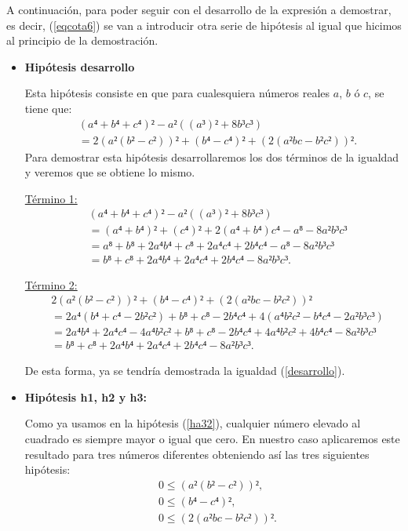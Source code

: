 \begin{demostracion}
  A continuación, para poder seguir con el desarrollo de la expresión a
  demostrar, es decir, (\ref{eqcota6}) se van a introducir otra serie de
  hipótesis al igual que hicimos al principio de la demostración.
  \begin{itemize}
  \item \textbf{Hipótesis desarrollo}

    Esta hipótesis consiste en que para cualesquiera números reales
    \(a\), \(b\) ó \(c\), se tiene que:
    \begin{align*}\label{desarrollo}\tag{desarrollo}
      & (a⁴+b⁴+c⁴)²-a²((a³)²+8b³c³) \\
      & = 2(a²(b²-c²))²+(b⁴-c⁴)²+(2(a²bc-b²c²))².
    \end{align*}
    Para demostrar esta hipótesis desarrollaremos los dos términos de la
    igualdad y veremos que se obtiene lo mismo.

    \underline{Término 1:}
    \begin{align*}
      & (a⁴+b⁴+c⁴)²-a²((a³)²+8b³c³)\\
      & = (a⁴+b⁴)²+(c⁴)²+2(a⁴+b⁴)c⁴-a⁸-8a²b³c³\\
      & = a⁸+b⁸+2a⁴b⁴+c⁸+2a⁴c⁴+2b⁴c⁴-a⁸-8a²b³c³\\
      & = b⁸+c⁸+2a⁴b⁴+2a⁴c⁴+2b⁴c⁴-8a²b³c³.
    \end{align*}

    \underline{Término 2:}
    \begin{align*}
      & 2(a²(b²-c²))²+(b⁴-c⁴)²+(2(a²bc-b²c²))² \\
      & = 2a⁴(b⁴+c⁴-2b²c²)+b⁸+c⁸-2b⁴c⁴+4(a⁴b²c²-b⁴c⁴-2a²b³c³)\\
      & = 2a⁴b⁴+2a⁴c⁴-4a⁴b²c²+b⁸+c⁸-2b⁴c⁴+4a⁴b²c²+4b⁴c⁴-8a²b³c³\\
      & = b⁸+c⁸+2a⁴b⁴+2a⁴c⁴+2b⁴c⁴-8a²b³c³.
    \end{align*}

    De esta forma, ya se tendría demostrada la igualdad (\ref{desarrollo}).

  \item \textbf{Hipótesis h1, h2 y h3:}

    Como ya usamos en la hipótesis (\ref{ha32}), cualquier número
    elevado al cuadrado es siempre mayor o igual que cero. En nuestro
    caso aplicaremos este resultado para tres números diferentes
    obteniendo así las tres siguientes hipótesis:
    \begin{align}
      &0 ≤ (a²(b²-c²))²,\label{h1cota}\tag{h1}\\
      &0 ≤ (b⁴-c⁴)², \label{h2cota}\tag{h2}\\
      &0 ≤ (2(a²bc-b²c²))².\label{h3cota}\tag{h3}
    \end{align}


\end{itemize}
\end{demostracion}
